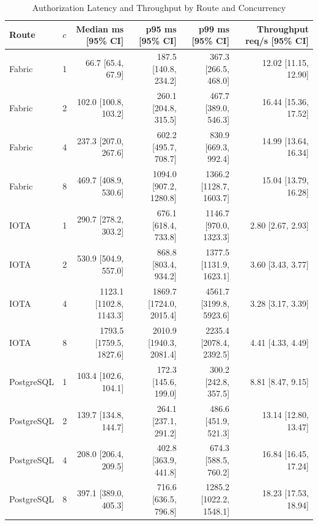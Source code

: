 \begin{table}[t]
\caption{Authorization Latency and Throughput by Route and Concurrency}
\label{tab:authorization}
\centering
\scriptsize
\begin{tabular}{@{}llrrrr@{}}
\toprule
Route & $c$ & Median ms [95\% CI] & p95 ms [95\% CI] & p99 ms [95\% CI] & Throughput req/s [95\% CI] \\
\midrule
Fabric & 1 & 66.7 [65.4, 67.9] & 187.5 [140.8, 234.2] & 367.3 [266.5, 468.0] & 12.02 [11.15, 12.90] \\
Fabric & 2 & 102.0 [100.8, 103.2] & 260.1 [204.8, 315.5] & 467.7 [389.0, 546.3] & 16.44 [15.36, 17.52] \\
Fabric & 4 & 237.3 [207.0, 267.6] & 602.2 [495.7, 708.7] & 830.9 [669.3, 992.4] & 14.99 [13.64, 16.34] \\
Fabric & 8 & 469.7 [408.9, 530.6] & 1094.0 [907.2, 1280.8] & 1366.2 [1128.7, 1603.7] & 15.04 [13.79, 16.28] \\
IOTA & 1 & 290.7 [278.2, 303.2] & 676.1 [618.4, 733.8] & 1146.7 [970.0, 1323.3] & 2.80 [2.67, 2.93] \\
IOTA & 2 & 530.9 [504.9, 557.0] & 868.8 [803.4, 934.2] & 1377.5 [1131.9, 1623.1] & 3.60 [3.43, 3.77] \\
IOTA & 4 & 1123.1 [1102.8, 1143.3] & 1869.7 [1724.0, 2015.4] & 4561.7 [3199.8, 5923.6] & 3.28 [3.17, 3.39] \\
IOTA & 8 & 1793.5 [1759.5, 1827.6] & 2010.9 [1940.3, 2081.4] & 2235.4 [2078.4, 2392.5] & 4.41 [4.33, 4.49] \\
PostgreSQL & 1 & 103.4 [102.6, 104.1] & 172.3 [145.6, 199.0] & 300.2 [242.8, 357.5] & 8.81 [8.47, 9.15] \\
PostgreSQL & 2 & 139.7 [134.8, 144.7] & 264.1 [237.1, 291.2] & 486.6 [451.9, 521.3] & 13.14 [12.80, 13.47] \\
PostgreSQL & 4 & 208.0 [206.4, 209.5] & 402.8 [363.9, 441.8] & 674.3 [588.5, 760.2] & 16.84 [16.45, 17.24] \\
PostgreSQL & 8 & 397.1 [389.0, 405.3] & 716.6 [636.5, 796.8] & 1285.2 [1022.2, 1548.1] & 18.23 [17.53, 18.94] \\
\bottomrule
\end{tabular}
\end{table}

